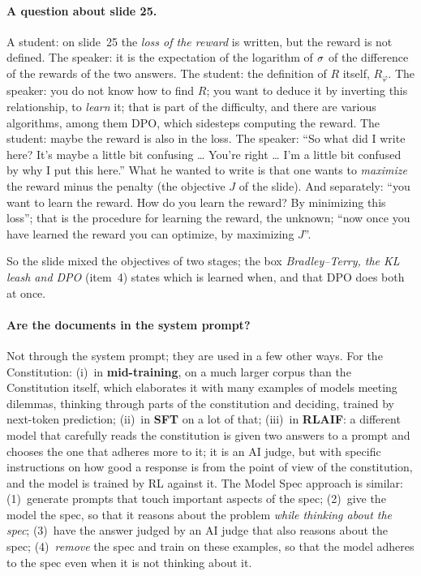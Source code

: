\paragraph{A question about slide 25.}
\begin{discussion}
A student: on slide~25 the \emph{loss of the reward} is written, but the reward is not defined. The speaker: it is the expectation of the logarithm of $\sigma$ of the difference of the rewards of the two answers. The student: the definition of $R$ itself, $R_\varphi$. The speaker: you do not know how to find $R$; you want to deduce it by inverting this relationship, to \emph{learn} it; that is part of the difficulty, and there are various algorithms, among them DPO, which sidesteps computing the reward. The student: maybe the reward is also in the loss. The speaker: ``So what did I write here? It's maybe a little bit confusing \ldots{} You're right \ldots{} I'm a little bit confused by why I put this here.'' What he wanted to write is that one wants to \emph{maximize} the reward minus the penalty (the objective $J$ of the slide). And separately: ``you want to learn the reward. How do you learn the reward? By minimizing this loss''; that is the procedure for learning the reward, the unknown; ``now once you have learned the reward you can optimize, by maximizing $J$''.
\end{discussion}
\noindent So the slide mixed the objectives of two stages; the box \emph{Bradley--Terry, the KL leash and DPO} (item~4) states which is learned when, and that DPO does both at once.

\paragraph{Are the documents in the system prompt?}
\begin{discussion}
Not through the system prompt; they are used in a few other ways. For the Constitution: (i)~in \textbf{mid-training}, on a much larger corpus than the Constitution itself, which elaborates it with many examples of models meeting dilemmas, thinking through parts of the constitution and deciding, trained by next-token prediction; (ii)~in \textbf{SFT} on a lot of that; (iii)~in \textbf{RLAIF}: a different model that carefully reads the constitution is given two answers to a prompt and chooses the one that adheres more to it; it is an AI judge, but with specific instructions on how good a response is from the point of view of the constitution, and the model is trained by RL against it. The Model Spec approach is similar: (1)~generate prompts that touch important aspects of the spec; (2)~give the model the spec, so that it reasons about the problem \emph{while thinking about the spec}; (3)~have the answer judged by an AI judge that also reasons about the spec; (4)~\emph{remove} the spec and train on these examples, so that the model adheres to the spec even when it is not thinking about it.
\end{discussion}

